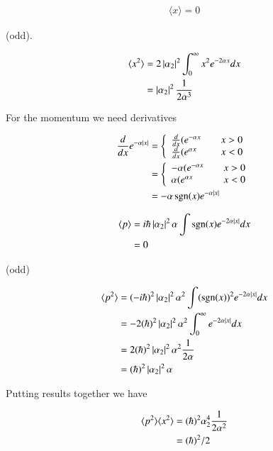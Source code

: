 \documentclass{article}
\DeclareMathOperator{\sgn}{sgn}
\newcommand{\expectation}[1]{\langle{#1}\rangle}
\begin{document}
\begin{align*}
\expectation{x} = 0
\end{align*}

(odd).

\begin{align*}
\expectation{x^2} 
&= 2 \Abs{\alpha_2}^2 \int_0^\infty x^2 e^{-2\alpha x} dx \\
&= \Abs{\alpha_2}^2 \inv{2 \alpha^3}
\end{align*}

For the momentum we need derivatives

\begin{align*}
\frac{d}{dx} e^{-\alpha \Abs{x}} 
&=
\left\{
\begin{array}{l l}
\frac{d}{dx}(e^{-\alpha x} & \quad \mbox{$x>0$} \\
\frac{d}{dx}(e^{\alpha x} & \quad \mbox{$x<0$} \\
\end{array}
\right. \\
&=
\left\{
\begin{array}{l l}
-\alpha (e^{-\alpha x} & \quad \mbox{$x>0$} \\
\alpha (e^{\alpha x} & \quad \mbox{$x<0$} \\
\end{array}
\right. \\
&=
-\alpha \sgn(x) e^{-\alpha \Abs{x}}
\end{align*}

\begin{align*}
\expectation{p} 
&= i \hbar \Abs{\alpha_2}^2 \alpha \int \sgn(x) e^{-2\alpha\Abs{x}} dx  \\
&= 0
\end{align*}

(odd)

\begin{align*}
\expectation{p^2} 
&= (-i \hbar)^2 \Abs{\alpha_2}^2 \alpha^2 \int (\sgn(x))^2 e^{-2\alpha\Abs{x}} dx  \\
&= - 2(\hbar)^2 \Abs{\alpha_2}^2 \alpha^2 \int_0^\infty e^{-2\alpha\Abs{x}} dx  \\
&= 2(\hbar)^2 \Abs{\alpha_2}^2 \alpha^2 \inv{2\alpha} \\
&= (\hbar)^2 \Abs{\alpha_2}^2 \alpha \\
\end{align*}

Putting results together we have

\begin{align*}
\expectation{p^2} \expectation{x^2} 
&= (\hbar)^2 \alpha_2^4 \inv{2 \alpha^2} \\
&= (\hbar)^2/2
\end{align*}
\end{document}
